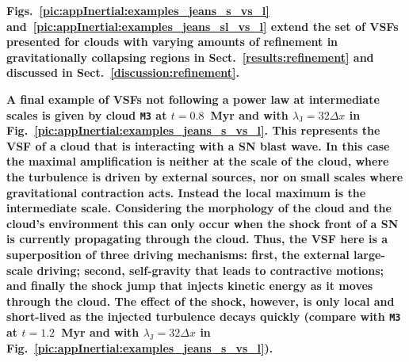 \textbf{
Figs.~\ref{pic:appInertial:examples_jeans_s_vs_l} and~\ref{pic:appInertial:examples_jeans_sl_vs_l} extend the set of VSFs presented for clouds with varying amounts of refinement in gravitationally collapsing regions in Sect.~\ref{results:refinement} and discussed in Sect.~\ref{discussion:refinement}.
}

\textbf{
A final example of VSFs not following a power law at intermediate scales is given by cloud \texttt{M3} at $t=0.8$~Myr and with $\lambda_\mathrm{J} = 32\Delta x$ in Fig.~\ref{pic:appInertial:examples_jeans_s_vs_l}.
This represents the VSF of a cloud that is interacting with a SN blast wave.
In this case the maximal amplification is neither at the scale of the cloud, where the turbulence is driven by external sources, nor on small scales where gravitational contraction acts.
Instead the local maximum is the intermediate scale. 
Considering the morphology of the cloud and the cloud's environment this can only occur when the shock front of a SN is currently propagating through the cloud. 
Thus, the VSF here is a superposition of three driving mechanisms:
first, the external large-scale driving; second, self-gravity that leads to contractive motions; and finally the shock jump that injects kinetic energy as it moves through the cloud. 
The effect of the shock, however, is only local and short-lived as the injected turbulence decays quickly (compare with \texttt{M3} at $t=1.2$~Myr and with $\lambda_\mathrm{J} = 32\Delta x$ in Fig.~\ref{pic:appInertial:examples_jeans_s_vs_l}).
}












